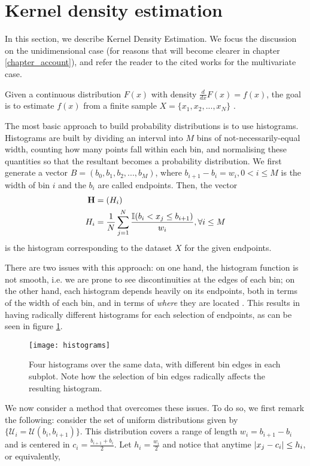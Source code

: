 \documentclass[../main.tex]{subfiles}
\begin{document}
\section{Kernel density estimation} \label{section_kde}
In this section, we describe Kernel Density Estimation. We focus the discussion on the unidimensional case (for reasons that will become clearer in chapter \ref{chapter_account}), and refer the reader to the cited works for the multivariate case. 
\par Given a continuous distribution $F(x)$ with density $\frac{d}{dx}F(x) = f(x)$, the goal is to estimate $f(x)$ from a finite sample $X = \{x_1, x_2, ..., x_N\}$ \cite{Hansen2009}. 
\par The most basic approach to build probability distributions is to use histograms. Histograms are built by dividing an interval into $M$ bins of not-necessarily-equal width, counting how many points fall within each bin, and normalising these quantities so that the resultant becomes a probability distribution. We first generate a vector $B = (b_0, b_1, b_2, ..., b_M)$, where $b_{i+1} - b_i = w_i, 0 < i \leq M$ is the width of bin $i$ and the $b_i$ are called endpoints. Then, the vector 
\begin{align*}
\mathbf{H} &= (H_i)\\
H_i &= \frac{1}{N}\sum_{j=1}^{N}\frac{\mathbb{I}( b_{i} < x_j \leq b_{i+1})}{w_i}, \forall i \leq M
\end{align*}
is the histogram corresponding to the dataset $X$ for the given endpoints.
\par There are two issues with this approach: on one hand, the histogram function is not smooth, i.e. we are prone to see discontinuities at the edges of each bin; on the other hand, each histogram depends heavily on its endpoints, both in terms of the width of each bin, and in terms of \emph{where} they are located \cite{Duong2004}. This results in having radically different histograms for each selection of endpoints, as can be seen in figure \ref{fig_histograms}.
\begin{figure}[t]
\centering
\texttt{[image: histograms]}
\caption{Four histograms over the same data, with different bin edges in each subplot. Note how the selection of bin edges radically affects the resulting histogram.}
\label{fig_histograms}
\end{figure}
\par We now consider a method that overcomes these issues. To do so, we first remark the following: consider the set of uniform distributions given by $\{\mathcal{U}_i = \mathcal{U}(b_{i}, b_{i+1})\}$. This distribution covers a range of length $w_i = b_{i+1}-b_i$ and is centered in $c_i = \frac{b_{i+1}+b_i}{2}$.  Let $h_i = \frac{w_i}{2}$ and notice that anytime $\lvert x_j - c_i\rvert \leq h_i$, or equivalently,
\end{document}
